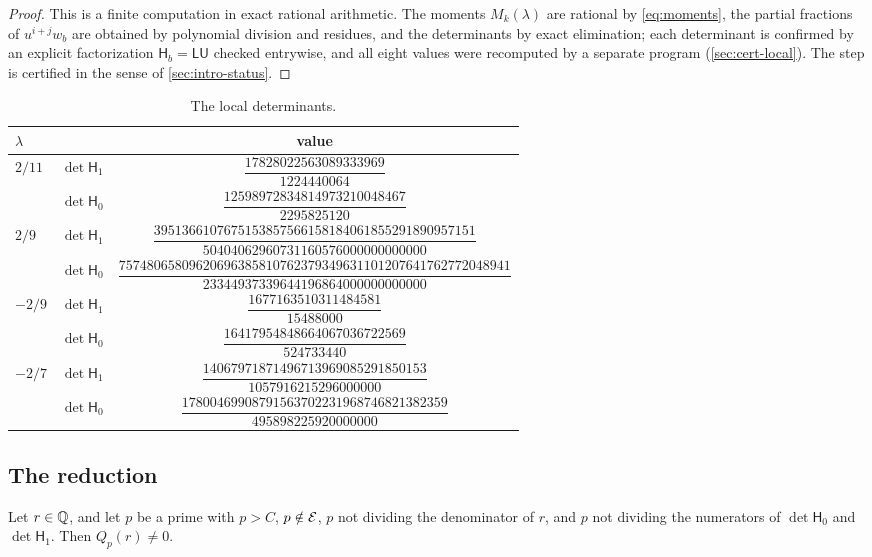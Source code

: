 \begin{proof}
This is a finite computation in exact rational arithmetic. The moments $M_k(\lambda)$ are rational by \eqref{eq:moments}, the partial fractions of $u^{i+j}w_b$ are obtained by polynomial division and residues, and the determinants by exact elimination; each determinant is confirmed by an explicit factorization $\mathsf H_b=\mathsf L\mathsf U$ checked entrywise, and all eight values were recomputed by a separate program (\cref{sec:cert-local}). The step is certified in the sense of \cref{sec:intro-status}.
\end{proof}

\begin{table}[ht]
\centering
\caption{The local determinants.}
\label{tab:local-dets}
\small
\begin{tabular}{@{}llc@{}}
\toprule
$\lambda$ & & value\\
\midrule
$2/11$ & $\det\mathsf H_1$ & $\dfrac{17828022563089333969}{1224440064}$\\[9pt]
 & $\det\mathsf H_0$ & $\dfrac{12598972834814973210048467}{2295825120}$\\[9pt]
$2/9$ & $\det\mathsf H_1$ & $\dfrac{3951366107675153857566158184061855291890957151}{50404062960731160576000000000000}$\\[9pt]
 & $\det\mathsf H_0$ & $\dfrac{75748065809620696385810762379349631101207641762772048941}{23344937339644196864000000000000}$\\[9pt]
$-2/9$ & $\det\mathsf H_1$ & $\dfrac{1677163510311484581}{15488000}$\\[9pt]
 & $\det\mathsf H_0$ & $\dfrac{16417954848664067036722569}{524733440}$\\[9pt]
$-2/7$ & $\det\mathsf H_1$ & $\dfrac{14067971871496713969085291850153}{1057916215296000000}$\\[9pt]
 & $\det\mathsf H_0$ & $\dfrac{17800469908791563702231968746821382359}{495898225920000000}$\\[9pt]
\bottomrule
\end{tabular}
\end{table}

\subsection{The reduction}\label{sec:reduction}

\begin{theorem}\label{thm:nonvanishing-general}
Let $r\in\mathbb{Q}$, and let $p$ be a prime with $p>C$, $p\notin\mathcal{E}$, $p$ not dividing the denominator of $r$, and $p$ not dividing the numerators of $\det\mathsf H_0$ and $\det\mathsf H_1$. Then $Q_p(r)\ne0$.
\end{theorem}

